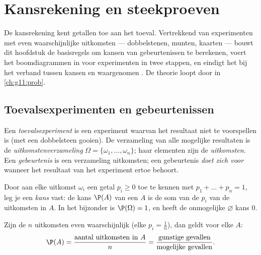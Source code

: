 \chapter{Kansrekening en steekproeven}\label{ch:g10:proba}

De kansrekening kent getallen toe aan het toeval. Vertrekkend van experimenten
met even waarschijnlijke uitkomsten --- dobbelstenen, munten, kaarten --- bouwt
dit hoofdstuk de basisregels om kansen van gebeurtenissen te berekenen, voert
het boomdiagrammen in voor experimenten in twee stappen, en eindigt het bij het
verband tussen kansen en waargenomen . De theorie loopt door in
\cref{ch:g11:prob}.

\section{Toevalsexperimenten en gebeurtenissen}

\begin{definition}\label{def:g10:proba:events}
Een \emph{toevalsexperiment} is een experiment
waarvan het resultaat niet te voorspellen is (met een dobbelsteen gooien). De
verzameling van alle mogelijke resultaten is de
\emph{uitkomstenverzameling}
$\Omega = \{\omega_1, \dots, \omega_n\}$; haar elementen zijn de
\emph{uitkomsten}. Een \emph{gebeurtenis} is een
verzameling uitkomsten; een gebeurtenis \emph{doet zich voor} wanneer het
resultaat van het experiment ertoe behoort.
\end{definition}

\begin{definition}[Kansverdeling]\label{def:g10:proba:distribution}
Door aan elke uitkomst $\omega_i$ een getal $p_i \geq 0$ toe te kennen met
$p_1 + \dots + p_n = 1$, leg je een \emph{kans} vast: de kans
$\P(A)$ van een  $A$ is de som van de $p_i$ van de uitkomsten in
$A$. In het bijzonder is $\P(\Omega) = 1$, en heeft de onmogelijke
 $\varnothing$ kans $0$.
\end{definition}

\begin{proposition}\label{prop:g10:proba:uniform}
Zijn de $n$ uitkomsten even waarschijnlijk (elke $p_i = \frac1n$), dan geldt
voor elke  $A$:
\[
\P(A) = \frac{\text{aantal uitkomsten in } A}{n}
= \frac{\text{gunstige gevallen}}{\text{mogelijke gevallen}} .
\]
\end{proposition}

